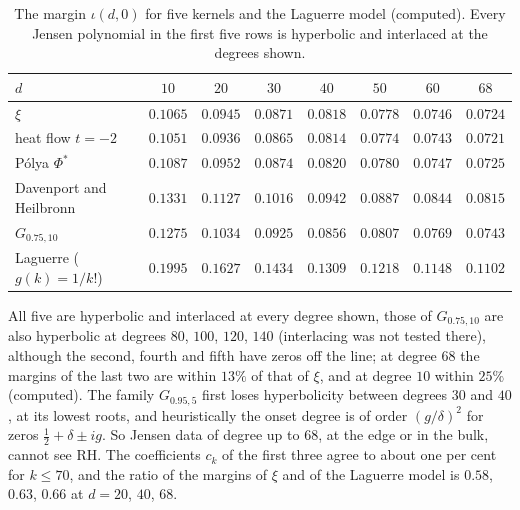 \begin{table}[ht]
\centering\scriptsize\setlength{\tabcolsep}{4pt}
\begin{tabular}{lccccccc}
\toprule
$d$ & $10$ & $20$ & $30$ & $40$ & $50$ & $60$ & $68$\\
\midrule
$\xi$ & $0.1065$ & $0.0945$ & $0.0871$ & $0.0818$ & $0.0778$ & $0.0746$ & $0.0724$\\
heat flow $t=-2$ & $0.1051$ & $0.0936$ & $0.0865$ & $0.0814$ & $0.0774$ & $0.0743$ & $0.0721$\\
P\'olya $\Phi^*$ & $0.1087$ & $0.0952$ & $0.0874$ & $0.0820$ & $0.0780$ & $0.0747$ & $0.0725$\\
Davenport and Heilbronn & $0.1331$ & $0.1127$ & $0.1016$ & $0.0942$ & $0.0887$ & $0.0844$ & $0.0815$\\
$G_{0.75,10}$ & $0.1275$ & $0.1034$ & $0.0925$ & $0.0856$ & $0.0807$ & $0.0769$ & $0.0743$\\
Laguerre ($g(k)=1/k!$) & $0.1995$ & $0.1627$ & $0.1434$ & $0.1309$ & $0.1218$ & $0.1148$ & $0.1102$\\
\bottomrule
\end{tabular}
\caption{The margin $\iota(d,0)$ for five kernels and the Laguerre model (computed). Every Jensen polynomial in the first five rows is hyperbolic and interlaced at the degrees shown.}\label{ht:tab:kernels}
\end{table}

All five are hyperbolic and interlaced at every degree shown, those of $G_{0.75,10}$ are also hyperbolic at degrees $80$, $100$, $120$, $140$ (interlacing was not tested there), although the second, fourth and fifth have zeros off the line; at degree $68$ the margins of the last two are within $13\%$ of that of $\xi$, and at degree $10$ within $25\%$ (computed). The family $G_{0.95,5}$ first loses hyperbolicity between degrees $30$ and $40$, at its lowest roots, and heuristically the onset degree is of order $(g/\delta)^2$ for zeros $\tfrac12+\delta\pm ig$. So Jensen data of degree up to $68$, at the edge or in the bulk, cannot see RH. The coefficients $c_k$ of the first three agree to about one per cent for $k\le70$, and the ratio of the margins of $\xi$ and of the Laguerre model is $0.58$, $0.63$, $0.66$ at $d=20$, $40$, $68$.

